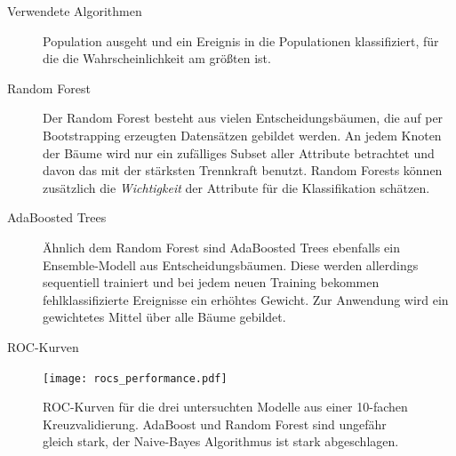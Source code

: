 \documentclass[t]{beamer}
\begin{document}
\begin{columns}[onlytextwidth]
\begin{column}{0.5\textwidth}
\begin{block}{Verwendete Algorithmen}
\begin{description}
            Population ausgeht und ein Ereignis in die Populationen klassifiziert, für
            die die Wahrscheinlichkeit am größten ist.
          \item[Random Forest] Der Random Forest \cite{rf} besteht aus vielen Entscheidungsbäumen,
            die auf per Bootstrapping erzeugten Datensätzen gebildet werden.
            An jedem Knoten der Bäume wird nur ein zufälliges Subset aller Attribute betrachtet und davon das mit der
            stärksten Trennkraft benutzt.
            Random Forests können zusätzlich die \emph{Wichtigkeit} der Attribute für die Klassifikation
            schätzen.
          \item[AdaBoosted Trees] Ähnlich dem Random Forest sind AdaBoosted Trees \cite{adaboost}
            ebenfalls ein Ensemble-Modell aus Entscheidungsbäumen.
            Diese werden allerdings sequentiell trainiert und bei jedem neuen
            Training bekommen fehlklassifizierte Ereignisse ein erhöhtes Gewicht.
            Zur Anwendung wird ein gewichtetes Mittel über alle Bäume gebildet.
        \end{description}
      \end{block}
      \begin{block}{ROC-Kurven}
        \begin{multicols}{2}
          \begin{figure}
            \centering
            \texttt{[image: rocs\_performance.pdf]}
            \caption{ROC-Kurven für die drei untersuchten Modelle aus einer 10-fachen
            Kreuzvalidierung. AdaBoost und Random Forest sind ungefähr gleich stark,
          der Naive-Bayes Algorithmus ist stark abgeschlagen.}
            \label{fig:name}
          \end{figure}
          \begin{center}
            
          \end{center}
        \end{multicols}
      \end{block}


\end{column}
\end{columns}
\end{document}
